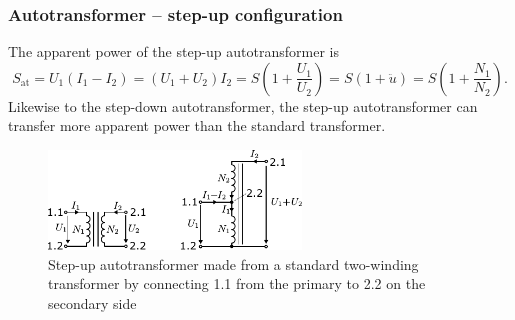 \begin{frame}
	\frametitle{Autotransformer -- step-up configuration}
	The apparent power of the step-up autotransformer is 
	\begin{equation}
		S_\mathrm{at} = U_1 (I_1-I_2) = (U_1+U_2)I_2 = S(1+\frac{U_1}{U_2})= S(1+\ddot{u})= S(1+\frac{N_1}{N_2}).
	\end{equation}
	Likewise to the step-down autotransformer, the step-up autotransformer can transfer more apparent power than the standard transformer.
	\begin{figure}
		\includegraphics[width=0.6\textwidth]{fig/lec04/Autotransformer_step_up.pdf}
		\caption{Step-up autotransformer made from a standard two-winding transformer by connecting 1.1 from the primary to 2.2 on the secondary side}
		\label{fig:Autotransformer_step_up}
	\end{figure}
\end{frame}

